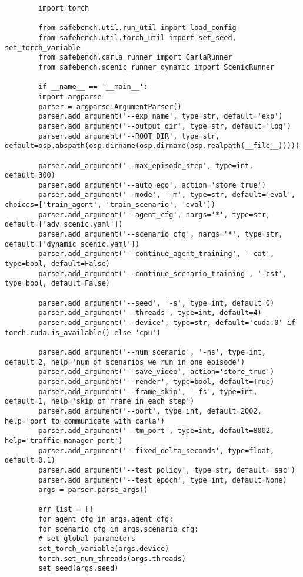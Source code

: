 \begin{enumerate}
\begin{verbatim}
		import torch 
		
		from safebench.util.run_util import load_config
		from safebench.util.torch_util import set_seed, set_torch_variable
		from safebench.carla_runner import CarlaRunner
		from safebench.scenic_runner_dynamic import ScenicRunner
		
		if __name__ == '__main__':
		import argparse
		parser = argparse.ArgumentParser()
		parser.add_argument('--exp_name', type=str, default='exp')
		parser.add_argument('--output_dir', type=str, default='log')
		parser.add_argument('--ROOT_DIR', type=str, default=osp.abspath(osp.dirname(osp.dirname(osp.realpath(__file__)))))
		
		parser.add_argument('--max_episode_step', type=int, default=300)
		parser.add_argument('--auto_ego', action='store_true')
		parser.add_argument('--mode', '-m', type=str, default='eval', choices=['train_agent', 'train_scenario', 'eval'])
		parser.add_argument('--agent_cfg', nargs='*', type=str, default=['adv_scenic.yaml'])
		parser.add_argument('--scenario_cfg', nargs='*', type=str, default=['dynamic_scenic.yaml'])
		parser.add_argument('--continue_agent_training', '-cat', type=bool, default=False)
		parser.add_argument('--continue_scenario_training', '-cst', type=bool, default=False)
		
		parser.add_argument('--seed', '-s', type=int, default=0)
		parser.add_argument('--threads', type=int, default=4)
		parser.add_argument('--device', type=str, default='cuda:0' if torch.cuda.is_available() else 'cpu')   
		
		parser.add_argument('--num_scenario', '-ns', type=int, default=2, help='num of scenarios we run in one episode')
		parser.add_argument('--save_video', action='store_true')
		parser.add_argument('--render', type=bool, default=True)
		parser.add_argument('--frame_skip', '-fs', type=int, default=1, help='skip of frame in each step')
		parser.add_argument('--port', type=int, default=2002, help='port to communicate with carla')
		parser.add_argument('--tm_port', type=int, default=8002, help='traffic manager port')
		parser.add_argument('--fixed_delta_seconds', type=float, default=0.1)
		parser.add_argument('--test_policy', type=str, default='sac')
		parser.add_argument('--test_epoch', type=int, default=None)
		args = parser.parse_args()
		
		err_list = []
		for agent_cfg in args.agent_cfg:
		for scenario_cfg in args.scenario_cfg:
		# set global parameters
		set_torch_variable(args.device)
		torch.set_num_threads(args.threads)
		set_seed(args.seed)
		

\end{verbatim}
\end{enumerate}
